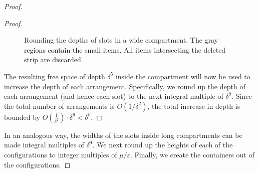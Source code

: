 \documentclass[10pt,a4paper]{amsart}
\newcommand{\kvnnew}[1]{\textcolor{black}{#1}}
\renewcommand{\epsilon}{\varepsilon} %
\theoremstyle{definition}
\begin{document}
\begin{proof}
\begin{proof}
\begin{figure}
    \caption{Rounding the depths of slots in a wide compartment. \kvnnew{The gray regions contain the small items.} All items intersecting the deleted strip are discarded.}
    \label{fig:minStrip}
\end{figure}
    
The resulting free space of depth $\delta^5$ inside the compartment will now be used to increase the depth of each arrangement. Specifically, we round up the depth of each arrangement (and hence each slot) to the next integral multiple of $\delta^9$. Since the total number of arrangements is $O(1/\delta^2)$, the total increase in depth is bounded by $O(\frac{1}{\delta^2})\cdot \delta^9 < \delta^5$.  
\end{proof}

In an analogous way, the widths of the slots inside long compartments can be made integral multiples of $\delta^9$. We next round up the heights of each of the configurations to integer multiples of $\mu/\epsilon$. Finally, we create the containers out of the configurations.


\end{proof}
\end{document}
